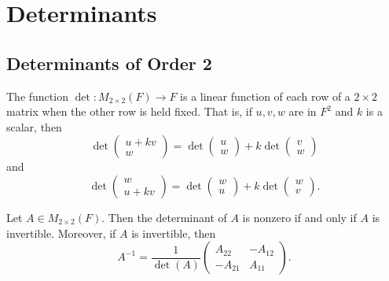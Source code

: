 \section{Determinants}
\subsection{Determinants of Order 2}
\begin{theorem}
    The function \(\det: M_{2 \times 2}(F) \to F\) is a linear function of each row of a \(2 \times 2\) matrix when the other row is held fixed. That is, if \(u, v, w\) are in \(F^2\) and \(k\) is a scalar, then
    \[
    \det \begin{pmatrix} u + kv \\ w \end{pmatrix}
    = \det \begin{pmatrix} u \\ w \end{pmatrix} + k \det \begin{pmatrix} v \\ w \end{pmatrix}
    \]
    and
    \[
    \det \begin{pmatrix} w \\ u + kv \end{pmatrix}
    = \det \begin{pmatrix} w \\ u \end{pmatrix} + k \det \begin{pmatrix} w \\ v \end{pmatrix}.
    \]
\end{theorem}
\vspace{5cm}
\begin{theorem}
    Let \(A \in M_{2 \times 2}(F)\). Then the determinant of \(A\) is nonzero if and only if \(A\) is invertible. Moreover, if \(A\) is invertible, then
    \[
    A^{-1} = \frac{1}{\det(A)} 
    \begin{pmatrix}
        A_{22} & -A_{12} \\
        -A_{21} & A_{11}
    \end{pmatrix}.
    \]
\end{theorem}
\newpage
